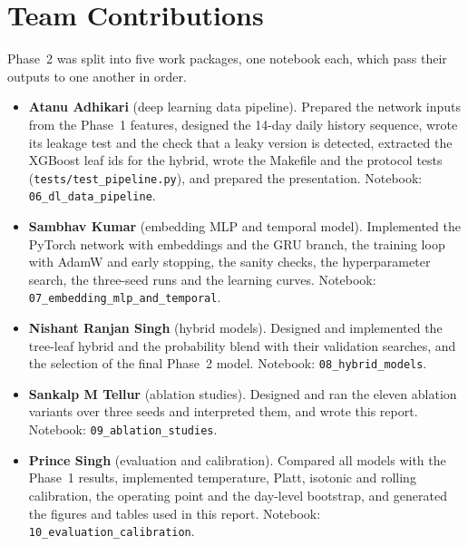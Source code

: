 \documentclass[conference]{IEEEtran}
\begin{document}
\section*{Team Contributions}
Phase~2 was split into five work packages, one notebook each, which pass their outputs
to one another in order.
\begin{itemize}
\item \textbf{Atanu Adhikari} (deep learning data pipeline). Prepared the network inputs
from the Phase~1 features, designed the 14-day daily history sequence, wrote its leakage
test and the check that a leaky version is detected, extracted the XGBoost leaf ids for
the hybrid, wrote the Makefile and the protocol tests (\texttt{tests/test\_pipeline.py}),
and prepared the presentation. Notebook: \texttt{06\_dl\_data\_pipeline}.
\item \textbf{Sambhav Kumar} (embedding MLP and temporal model). Implemented the PyTorch
network with embeddings and the GRU branch, the training loop with AdamW and early
stopping, the sanity checks, the hyperparameter search, the three-seed runs and the
learning curves. Notebook: \texttt{07\_embedding\_mlp\_and\_temporal}.
\item \textbf{Nishant Ranjan Singh} (hybrid models). Designed and implemented the
tree-leaf hybrid and the probability blend with their validation searches, and the
selection of the final Phase~2 model. Notebook: \texttt{08\_hybrid\_models}.
\item \textbf{Sankalp M Tellur} (ablation studies). Designed and ran the eleven ablation
variants over three seeds and interpreted them, and wrote this report.
Notebook: \texttt{09\_ablation\_studies}.
\item \textbf{Prince Singh} (evaluation and calibration). Compared all models with the
Phase~1 results, implemented temperature, Platt, isotonic and rolling calibration, the
operating point and the day-level bootstrap, and generated the figures and tables used
in this report. Notebook: \texttt{10\_evaluation\_calibration}.
\end{itemize}



\end{document}
